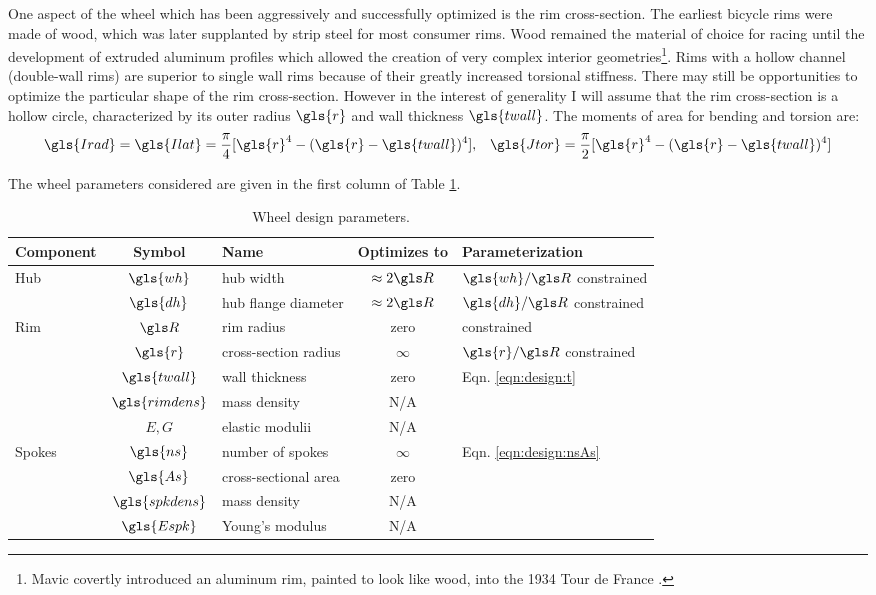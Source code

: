 \documentclass[\rootdir/thesis.tex]{subfiles}
\begin{document}
One aspect of the wheel which has been aggressively and successfully optimized is the rim cross-section. The earliest bicycle rims were made of wood, which was later supplanted by strip steel for most consumer rims. Wood remained the material of choice for racing until the development of extruded aluminum profiles which allowed the creation of very complex interior geometries\footnote{Mavic covertly introduced an aluminum rim, painted to look like wood, into the 1934 Tour de France \cite{Herlihy2004}.}. Rims with a hollow channel (double-wall rims) are superior to single wall rims because of their greatly increased torsional stiffness. There may still be opportunities to optimize the particular shape of the rim cross-section. However in the interest of generality I will assume that the rim cross-section is a hollow circle, characterized by its outer radius $\gls{r}$ and wall thickness $\gls{twall}$. The moments of area for bending and torsion are:
\begin{equation}
\gls{Irad} = \gls{Ilat} = \frac{\pi}{4} [\gls{r}^4 - (\gls{r}-\gls{twall})^4], \,\,\,\,\,
\gls{Jtor} = \frac{\pi}{2} [\gls{r}^4 - (\gls{r}-\gls{twall})^4]
\end{equation}

The wheel parameters considered are given in the first column of Table \ref{tab:design_space}.

\begin{table}
\caption{Wheel design parameters.}
\label{tab:design_space}
\begin{tabular}{lclcl}
\toprule
\bf Component & \bf Symbol & \bf Name & \bf Optimizes to & \bf Parameterization\\
\midrule
\multirow{2}{*}{Hub} & $\gls{wh}$ & hub width            & $\approx 2\R$ & $\gls{wh}/\R$ constrained\\
                     & $\gls{dh}$ & hub flange diameter  & $\approx 2\R$ & $\gls{dh}/\R$ constrained\\
\midrule
\multirow{5}{*}{Rim} & $\R$            & rim radius           & zero     & constrained\\
                     & $\gls{r}$       & cross-section radius & $\infty$ & $\gls{r}/\R$ constrained\\
                     & $\gls{twall}$   & wall thickness       & zero     & Eqn. \eqref{eqn:design:t}\\
                     & $\gls{rimdens}$ & mass density         & N/A\\
                     & $E,G$           & elastic modulii      & N/A\\
\midrule
\multirow{4}{*}{Spokes} & $\gls{ns}$      & number of spokes  & $\infty$ & \multirow{2}{*}{Eqn. \eqref{eqn:design:nsAs}}\\
                        & $\gls{As}$      & cross-sectional area & zero\\
                        & $\gls{spkdens}$ & mass density   & N/A\\
                        & $\gls{Espk}$    & Young's modulus & N/A\\
\bottomrule
\end{tabular}
\end{table}
\end{document}
